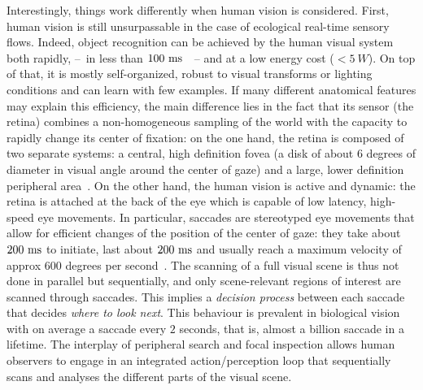 Interestingly, things work differently when human vision is considered. First, human vision is still unsurpassable in the case of ecological real-time sensory flows. Indeed, object recognition can be achieved by the human visual system both rapidly, --~in less than $100~\si{\milli\second}$~\cite{Kirchner06}~-- and at a low energy cost ($<5~W$). On top of that, it is mostly self-organized, robust to visual transforms or lighting conditions and can learn with few examples. If many different anatomical features may explain this efficiency, the main difference lies in the fact that its sensor (the retina) combines a non-homogeneous sampling of the world with the capacity to rapidly change its center of fixation: on the one hand, the retina is composed of two separate systems: a central, high definition fovea (a disk of about $6$ degrees of diameter in visual angle around the center of gaze) and a large, lower definition peripheral area~\cite{Strasburger11}. On the other hand, the human vision is active and dynamic: the retina is attached at the back of the eye which is capable of low latency, high-speed eye movements. In particular, saccades are stereotyped eye movements that allow for efficient changes of the position of the center of gaze: they take about $200~\si{\milli\second}$ to initiate, last about $200~\si{\milli\second}$ and usually reach a maximum velocity of approx $600$ degrees per second~\cite{Bahill75}. The scanning of a full visual scene is thus not done in parallel but sequentially, and only scene-relevant regions of interest are scanned through saccades. This implies a \emph{decision process} between each saccade that decides \emph{where to look next}. This behaviour is prevalent in biological vision with on average a saccade every $2$ seconds, that is, almost a billion saccade in a lifetime. The interplay of peripheral search and focal inspection allows human observers to engage in an integrated action/perception loop that sequentially scans and analyses the different parts of the visual scene.

